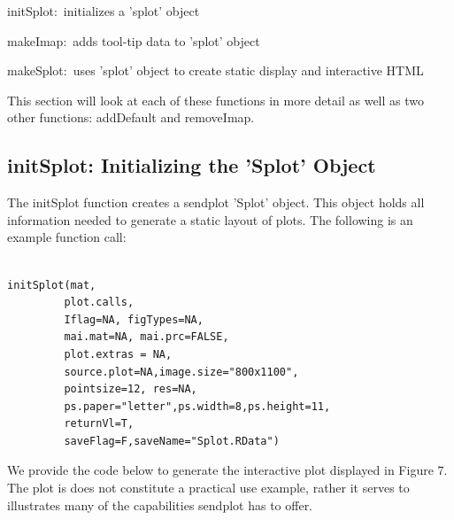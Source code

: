 \documentclass[]{article}
\begin{document}
\begin{description}
\item{initSplot:~}{initializes a 'splot' object}
\item{makeImap:~}{adds tool-tip data to 'splot' object}
\item{makeSplot:~}{uses 'splot' object to create static display and interactive HTML}
\end{description}

\indent This section will look at each of these functions in more detail as well as two other functions: addDefault and removeImap. 


\subsection{initSplot: Initializing the 'Splot' Object}

\indent The initSplot function creates a sendplot 'Splot' object. This object holds all information needed to generate a static layout of plots.  The following  is an example function call:

\begin{verbatim}

initSplot(mat,
         plot.calls,
         Iflag=NA, figTypes=NA,
         mai.mat=NA, mai.prc=FALSE,
         plot.extras = NA,
         source.plot=NA,image.size="800x1100",
         pointsize=12, res=NA,
         ps.paper="letter",ps.width=8,ps.height=11,
         returnVl=T,
         saveFlag=F,saveName="Splot.RData")

\end{verbatim}


We provide the code below to generate the interactive plot displayed in Figure 7. The plot is does not constitute a practical use example, rather it serves to illustrates many of the capabilities sendplot has to offer.  \newline
\end{document}
